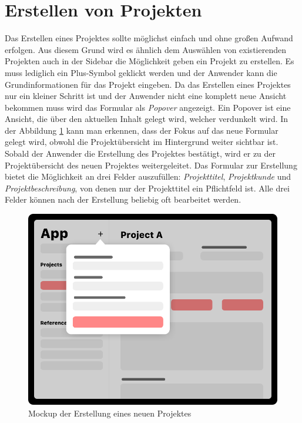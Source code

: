 \section{Erstellen von Projekten}
Das Erstellen eines Projektes sollte möglichst einfach und ohne großen Aufwand erfolgen.
Aus diesem Grund wird es ähnlich dem Auswählen von existierenden Projekten auch in der Sidebar die Möglichkeit geben ein Projekt zu erstellen.
Es muss lediglich ein Plus-Symbol geklickt werden und der Anwender kann die Grundinformationen für das Projekt eingeben.
Da das Erstellen eines Projektes nur ein kleiner Schritt ist und der Anwender nicht eine komplett neue Ansicht bekommen muss wird das Formular als \emph{Popover} angezeigt.
Ein Popover ist eine Ansicht, die über den aktuellen Inhalt gelegt wird, welcher verdunkelt wird.
In der Abbildung \ref{fig:design-project-create} kann man erkennen, dass der Fokus auf das neue Formular gelegt wird, obwohl die Projektübersicht im Hintergrund weiter sichtbar ist.
Sobald der Anwender die Erstellung des Projektes bestätigt, wird er zu der Projektübersicht des neuen Projektes weitergeleitet.
Das Formular zur Erstellung bietet die Möglichkeit an drei Felder auszufüllen:
\emph{Projekttitel}, \emph{Projektkunde} und \emph{Projektbeschreibung}, von denen nur der Projekttitel ein Pflichtfeld ist.
Alle drei Felder können nach der Erstellung beliebig oft bearbeitet werden.
\newpage
\begin{figure}[h!]
	\centering
	\vspace{15pt}
	\includegraphics[scale=0.4]{images/design-project-create}
	\caption{Mockup der Erstellung eines neuen Projektes}
	\label{fig:design-project-create}
\end{figure}
